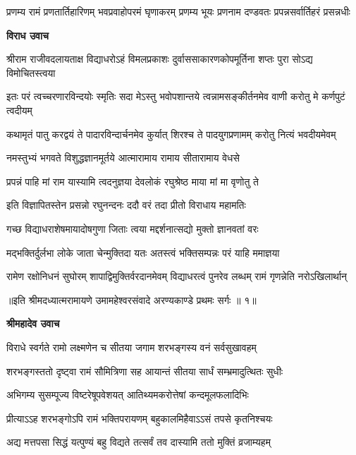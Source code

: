 \fourlineindentedshloka
{प्रणम्य रामं प्रणतार्तिहारिणम्}
{भवप्रवाहोपरमं घृणाकरम्}
{प्रणम्य भूयः प्रणनाम दण्डवतः}
{प्रपन्नसर्वार्तिहरं प्रसन्नधीः} %

\textbf{विराध उवाच}

\fourlineindentedshloka
{श्रीराम राजीवदलायताक्ष}
{विद्याधरोऽहं विमलप्रकाशः}
{दुर्वाससाकारणकोपमूर्तिना}
{शप्तः पुरा सोऽद्य विमोचितस्त्वया} %

\fourlineindentedshloka
{इतः परं त्वच्चरणारविन्दयोः}
{स्मृतिः सदा मेऽस्तु भवोपशान्तये}
{त्वन्नामसङ्कीर्तनमेव वाणी}
{करोतु मे कर्णपुटं त्वदीयम्} %

\fourlineindentedshloka
{कथामृतं पातु करद्वयं ते}
{पादारविन्दार्चनमेव कुर्यात्}
{शिरश्च ते पादयुगप्रणामम्}
{करोतु नित्यं भवदीयमेवम्} %

\twolineshloka
{नमस्तुभ्यं भगवते विशुद्धज्ञानमूर्तये}
{आत्मारामाय रामाय सीतारामाय वेधसे} %

\twolineshloka
{प्रपन्नं पाहि मां राम यास्यामि त्वदनुज्ञया}
{देवलोकं रघुश्रेष्ठ माया मां मा वृणोतु ते} %

\twolineshloka
{इति विज्ञापितस्तेन प्रसन्नो रघुनन्दनः}
{ददौ वरं तदा प्रीतो विराधाय महामतिः} %

\twolineshloka
{गच्छ विद्याधराशेषमायादोषगुणा जिताः}
{त्वया मद्दर्शनात्सद्यो मुक्तो ज्ञानवतां वरः} %

\twolineshloka
{मद्भक्तिर्दुर्लभा लोके जाता चेन्मुक्तिदा यतः}
{अतस्त्वं भक्तिसम्पन्नः परं याहि ममाज्ञया} %

\fourlineindentedshloka
{रामेण रक्षोनिधनं सुघोरम्}
{शापाद्विमुक्तिर्वरदानमेवम्}
{विद्याधरत्वं पुनरेव लब्धम्}
{रामं गृणन्नेति नरोऽखिलार्थान्} %

{॥इति श्रीमदध्यात्मरामायणे उमामहेश्वरसंवादे
अरण्यकाण्डे प्रथमः सर्गः ॥ १॥
}




\textbf{श्रीमहादेव उवाच}

\twolineshloka
{विराधे स्वर्गते रामो लक्ष्मणेन च सीतया}
{जगाम शरभङ्गस्य वनं सर्वसुखावहम्} %

\twolineshloka
{शरभङ्गस्ततो दृष्ट्वा रामं सौमित्रिणा सह}
{आयान्तं सीतया सार्धं सम्भ्रमादुत्थितः सुधीः} %

\twolineshloka
{अभिगम्य सुसम्पूज्य विष्टरेषूपवेशयत्}
{आतिथ्यमकरोत्तेषां कन्दमूलफलादिभिः} %

\twolineshloka
{प्रीत्याऽऽह शरभङ्गोऽपि रामं भक्तिपरायणम्}
{बहुकालमिहैवाऽऽसं तपसे कृतनिश्चयः} %

\twolineshloka
{अद्य मत्तपसा सिद्धं यत्पुण्यं बहु विद्यते}
{तत्सर्वं तव दास्यामि ततो मुक्तिं व्रजाम्यहम्} %

